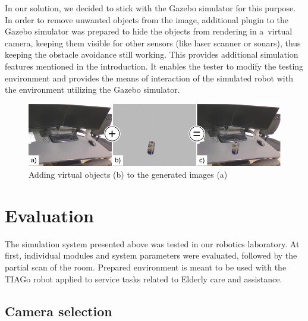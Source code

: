 \documentclass{svproc}
\begin{document}
In our solution, we decided to stick with the Gazebo simulator for this purpose.
In order to remove unwanted objects from the image, additional plugin to the Gazebo simulator
was prepared to hide the objects from rendering in a~virtual camera, keeping them 
visible for other sensors (like laser scanner or sonars), thus keeping the obstacle avoidance
still working. This provides additional simulation features mentioned in the introduction. 
It enables the tester to modify the testing environment and provides the means of interaction 
of the simulated robot with the environment utilizing the Gazebo simulator.

\begin{figure}[!ht]
    \centering
        \includegraphics{img/gazebo_integration/img.pdf}
    \caption{Adding virtual objects (b) to the generated images (a)}
    \label{fig:join}
    \vspace{-5mm}
\end{figure}



\section{Evaluation}
\label{sec:evaluation}

The simulation system presented above was tested in our robotics laboratory. At first, individual modules
and system parameters were evaluated, followed by the partial scan of the room. Prepared environment is 
meant to be used with the TIAGo robot applied to service tasks related to Elderly care and assistance.

\subsection{Camera selection}
\end{document}

